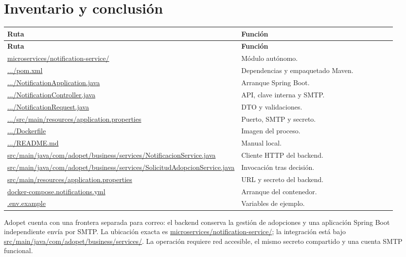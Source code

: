 \documentclass[11pt,a4paper]{article}
\newcommand{\pathcode}[1]{\small\url{#1}}\newcommand{\envvar}[1]{\small\url{#1}}
\begin{document}
\section{Inventario y conclusión}
\begin{longtable}{p{0.49\linewidth}p{0.44\linewidth}}\toprule\textbf{Ruta} & \textbf{Función}\\\midrule\endfirsthead
\toprule\textbf{Ruta} & \textbf{Función}\\\midrule\endhead
\pathcode{microservices/notification-service/} & Módulo autónomo.\\
\pathcode{.../pom.xml} & Dependencias y empaquetado Maven.\\
\pathcode{.../NotificationApplication.java} & Arranque Spring Boot.\\
\pathcode{.../NotificationController.java} & API, clave interna y SMTP.\\
\pathcode{.../NotificationRequest.java} & DTO y validaciones.\\
\pathcode{.../src/main/resources/application.properties} & Puerto, SMTP y secreto.\\
\pathcode{.../Dockerfile} & Imagen del proceso.\\
\pathcode{.../README.md} & Manual local.\\
\pathcode{src/main/java/com/adopet/business/services/NotificacionService.java} & Cliente HTTP del backend.\\
\pathcode{src/main/java/com/adopet/business/services/SolicitudAdopcionService.java} & Invocación tras decisión.\\
\pathcode{src/main/resources/application.properties} & URL y secreto del backend.\\
\pathcode{docker-compose.notifications.yml} & Arranque del contenedor.\\
\pathcode{.env.example} & Variables de ejemplo.\\\bottomrule\end{longtable}

Adopet cuenta con una frontera separada para correo: el backend conserva la gestión de adopciones y una aplicación Spring Boot independiente envía por SMTP. La ubicación exacta es \pathcode{microservices/notification-service/}; la integración está bajo \pathcode{src/main/java/com/adopet/business/services/}. La operación requiere red accesible, el mismo secreto compartido y una cuenta SMTP funcional.
\end{document}
